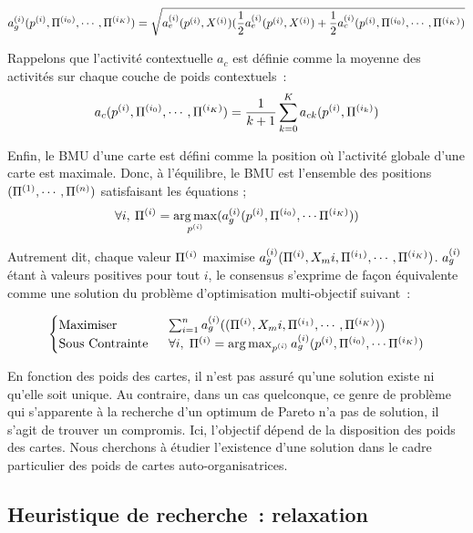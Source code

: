\documentclass[../main]{subfiles}
\begin{document}
\begin{equation}
	a_g^{({i})}(p^{({i})},\Pi^{({i_0})}, \cdots, \Pi^{({i_K})}) = \sqrt{a_e^{({i})}(p^{({i})},X^{({i})})(\frac{1}{2}a_e^{({i})}(p^{({i})},X^{({i})}) + \frac{1}{2}a_c^{({i})}(p^{({i})},\Pi^{({i_0})}, \cdots, \Pi^{({i_K})})}
\end{equation}

Rappelons que l'activité contextuelle $a_c$ est définie comme la moyenne des activités sur chaque couche de poids contextuels~:
\begin{equation}
	a_c(p^{({i})}, \Pi^{({i_0})}, \cdots, \Pi^{({i_K})}) = \frac{1}{k+1}\sum_{k=0}^{K}{a_{ck}(p^{({i})}, \Pi^{({i_k})})}
\end{equation}

Enfin, le BMU d'une carte est défini comme la position où l'activité globale d'une carte est maximale. Donc, à l'équilibre, le BMU est l'ensemble des positions $(\Pi^{({1})}, \cdots, \Pi^{({n})})$ satisfaisant les équations ; 
\begin{equation}
	\forall i, \: \Pi^{({i})} = \operatorname*{arg\,max}_{p^{({i})}}(a_g^{({i})}(p^{({i})},\Pi^{({i_0})}, \cdots \Pi^{({i_K})}))
\end{equation}

Autrement dit, chaque valeur $\Pi^{({i})}$ maximise $a_g^{({i})}(\Pi^{({i})},X_m{i},\Pi^{({i_1})}, \cdots, \Pi^{({i_K})})$. 
$a_g^{({i})}$ étant à valeurs positives pour tout $i$, le consensus s'exprime de façon équivalente comme une solution du problème d'optimisation multi-objectif suivant~:

\begin{equation}\label{eq:opti}
	\begin{cases}
	\text{Maximiser}\;& \sum_{i = 1}^n a_g^{({i})}((\Pi^{({i})},X_m{i},\Pi^{({i_1})}, \cdots, \Pi^{({i_K})})) \\
	\text{Sous Contrainte }\; &\forall i, \; \Pi^{({i})} = \operatorname*{arg\,max}_{p^{({i})}}a_g^{({i})}(p^{({i})},\Pi^{({i_0})}, \cdots \Pi^{({i_K})})
	\end{cases}
\end{equation}

En fonction des poids des cartes, il n'est pas assuré qu'une solution existe ni qu'elle soit unique. Au contraire, dans un cas quelconque, ce genre de problème qui s'apparente à la recherche d'un optimum de Pareto n'a pas de solution, il s'agit de trouver un compromis.
Ici, l'objectif dépend de la disposition des poids des cartes. Nous cherchons à étudier l'existence d'une solution dans le cadre particulier des poids de cartes auto-organisatrices.

\subsection{Heuristique de recherche~: relaxation}
\end{document}
